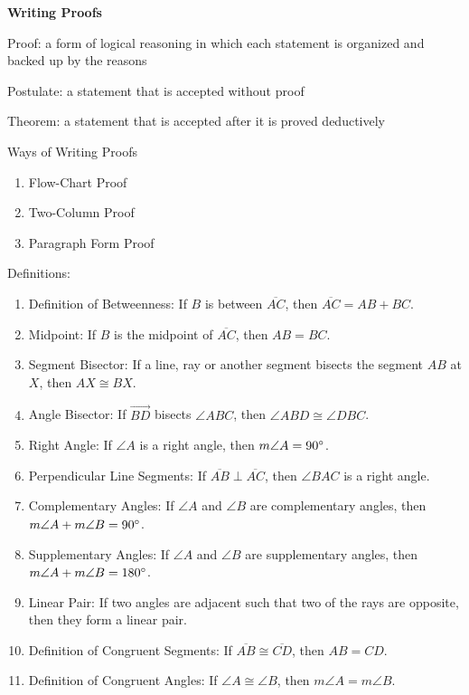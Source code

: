 
\begin{center}
\textbf{Writing Proofs 
}
\end{center}

\vspce

Proof: a form of logical reasoning in which each statement is organized and backed up by the reasons 
\vspce 

Postulate: a statement that is accepted without proof 

\vspce 

Theorem: a statement that is accepted after it is proved deductively

\vspce 

Ways of Writing Proofs 
\begin{enumerate}[label = \arabic*. ]
\item \hspce Flow-Chart Proof
\vspce
\item \hspce Two-Column Proof
\vspce
\item \hspce Paragraph Form Proof
\end{enumerate} 

\vspce 
\newpage
Definitions: 
\begin{enumerate}[label = \arabic*. ]
\item Definition of Betweenness: If $B$ is between $\overline{AC}$, then $\overline{AC}=AB + BC $.
\item Midpoint: If $B$ is the midpoint of $\overline{AC}$, then $AB = BC$.
\item Segment Bisector: If a line, ray or another segment bisects the segment $AB$ at $X$, then $AX \cong BX$.
\item Angle Bisector: If $\overrightarrow{BD}$ bisects $\angle{ABC} $, then $\angle{ABD} \cong \angle{DBC} $. 
\item Right Angle: If $\angle{A}$ is a right angle, then $m\angle{A}= 90\degree $.
\item Perpendicular Line Segments: If $\overline{AB}\perp \overline{AC}$, then $\angle{BAC}$ is a right angle.
\item Complementary Angles: If $\angle{A}$ and $\angle{B}$ are complementary angles, then $m\angle{A} + m\angle{B} = 90\degree$.
\item Supplementary Angles: If $\angle{A}$ and $\angle{B}$ are supplementary angles, then $m\angle{A} + m\angle{B} = 180\degree$.
\item Linear Pair: If two angles are adjacent such that two of the rays are opposite, then they form a linear pair.
\item Definition of Congruent Segments: If $\overline{AB}\cong\overline{CD}$, then $AB = CD$. 
\item Definition of Congruent Angles: If $\angle{A} \cong \angle{B}$, then $m\angle{A} = m\angle{B}$. 
\end{enumerate} 

